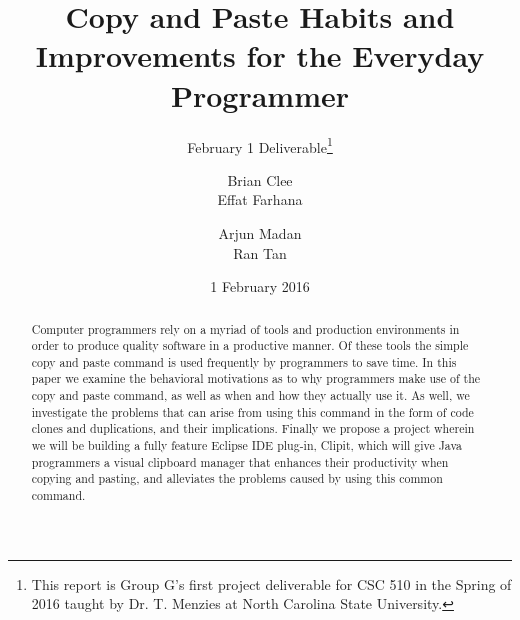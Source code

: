 \documentclass{acm_proc_article-sp}
\begin{document}
\title{Copy and Paste Habits and Improvements for the Everyday Programmer}
\subtitle{February 1 Deliverable\thanks{This report is Group G's first project deliverable for CSC 510 in the Spring of 2016 taught by Dr. T. Menzies at North Carolina State University.}}

\author{
\alignauthor
Brian Clee\\
\alignauthor
Effat Farhana\\
\and %
\alignauthor
Arjun Madan\\
\alignauthor
Ran Tan\\
}

\date{1 February 2016}
\maketitle

\begin{abstract}
Computer programmers rely on a myriad of tools and production environments in order to produce quality software in a productive manner. Of these tools the simple copy and paste command is used frequently by programmers to save time. In this paper we examine the behavioral motivations as to why programmers make use of the copy and paste command, as well as when and how they actually use it. As well, we investigate the problems that can arise from using this command in the form of code clones and duplications, and their implications. Finally we propose a project wherein we will be building a fully feature Eclipse IDE plug-in, Clipit, which will give Java programmers a visual clipboard manager that enhances their productivity when copying and pasting, and alleviates the problems caused by using this common command.
\end{abstract}
\end{document}
